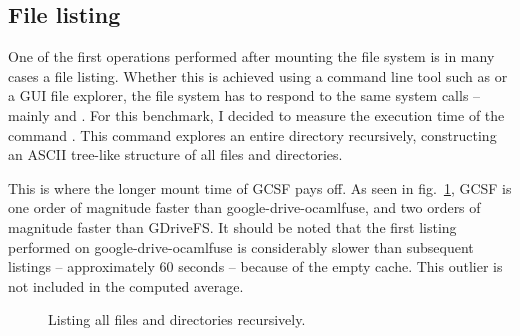 \subsection{File listing} \label{list_benchmark}

One of the first operations performed after mounting the file system is in many cases a file listing. Whether this is achieved using a command line tool such as  or a GUI file explorer, the file system has to respond to the same system calls -- mainly  and . For this benchmark, I decided to measure the execution time of the  command \cite{tree_man_page}. This  command explores an entire directory recursively, constructing an ASCII tree-like structure of all files and directories.

This is where the longer mount time of GCSF pays off. As seen in fig.~\ref{fig:tree_benchmark}, GCSF is one order of magnitude faster than google-drive-ocamlfuse, and two orders of magnitude faster than GDriveFS. It should be noted that the first listing performed on google-drive-ocamlfuse is considerably slower than subsequent listings -- approximately 60 seconds -- because of the empty cache. This outlier is not included in the computed average.


\begin{figure}[bpt]
\centering
{}
\caption{Listing all files and directories recursively.}
\label{fig:tree_benchmark}
\end{figure}


